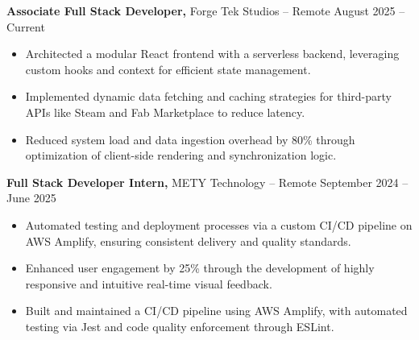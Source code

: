 \documentclass[11pt]{article}       %
\begin{document}
\textbf{Associate Full Stack Developer,} {Forge Tek Studios} -- Remote \hfill August 2025 -- Current 
\vspace{-9pt}
\begin{itemize}
  \item Architected a modular React frontend with a serverless backend, leveraging custom hooks and context for efficient state management.
  \item Implemented dynamic data fetching and caching strategies for third-party APIs like Steam and Fab Marketplace to reduce latency.
  \item Reduced system load and data ingestion overhead by 80\% through optimization of client-side rendering and synchronization logic.
\end{itemize}

\textbf{Full Stack Developer Intern,} {METY Technology} -- Remote \hfill September 2024 -- June 2025 
\vspace{-9pt}
\begin{itemize}
  \item Automated testing and deployment processes via a custom CI/CD pipeline on AWS Amplify, ensuring consistent delivery and quality standards.
  \item Enhanced user engagement by 25\% through the development of highly responsive and intuitive real-time visual feedback.
  \item Built and maintained a CI/CD pipeline using AWS Amplify, with automated testing via Jest and code quality enforcement through ESLint.
\end{itemize}
\end{document}
